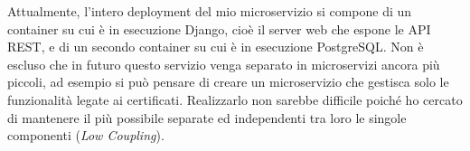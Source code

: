 Attualmente, l'intero deployment del mio microservizio si compone di un container
su cui è in esecuzione Django, cioè il server web che espone le API REST, e
di un secondo container su cui è in esecuzione PostgreSQL.
Non è escluso che in futuro questo servizio venga separato in microservizi
ancora più piccoli, ad esempio si può pensare di creare un microservizio
che gestisca solo le funzionalità legate ai certificati. Realizzarlo non sarebbe
difficile poiché ho cercato di mantenere il più possibile separate ed independenti
tra loro le singole componenti (\textit{Low Coupling}).


